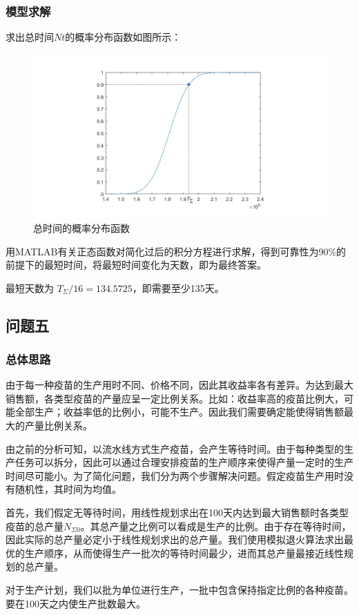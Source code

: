 \documentclass[UTF8]{ctexart}
\begin{document}
	\subsubsection{模型求解}
	求出总时间$Nt$的概率分布函数如图所示：
	\begin{figure}[H]
		\centering %
		\includegraphics[scale=0.5]{正态2.jpg}
		\caption{总时间的概率分布函数}
	\end{figure}
	\qquad 用MATLAB有关正态函数对简化过后的积分方程进行求解，得到可靠性为90\%的前提下的最短时间，将最短时间变化为天数，即为最终答案。
	
	\qquad 最短天数为 $ T_{\Sigma}/16 = 134.5725 $，即需要至少135天。

	\subsection{问题五}
	\subsubsection{总体思路}
	由于每一种疫苗的生产用时不同、价格不同，因此其收益率各有差异。为达到最大销售额，各类型疫苗的产量应呈一定比例关系。比如：收益率高的疫苗比例大，可能全部生产；收益率低的比例小，可能不生产。因此我们需要确定能使得销售额最大的产量比例关系。
	\par 由之前的分析可知，以流水线方式生产疫苗，会产生等待时间。由于每种类型的生产任务可以拆分，因此可以通过合理安排疫苗的生产顺序来使得产量一定时的生产时间尽可能小。为了简化问题，我们分为两个步骤解决问题。假定疫苗生产用时没有随机性，其时间为均值。
	\par 首先，我们假定无等待时间，用线性规划求出在100天内达到最大销售额时各类型疫苗的总产量$N_{\Sigma 0}$。其总产量之比例可以看成是生产的比例。由于存在等待时间，因此实际的总产量必定小于线性规划求出的总产量。我们使用模拟退火算法求出最优的生产顺序，从而使得生产一批次的等待时间最少，进而其总产量最接近线性规划的总产量。
	\par 对于生产计划，我们以批为单位进行生产，一批中包含保持指定比例的各种疫苗。要在100天之内使生产批数最大。
\end{document}
